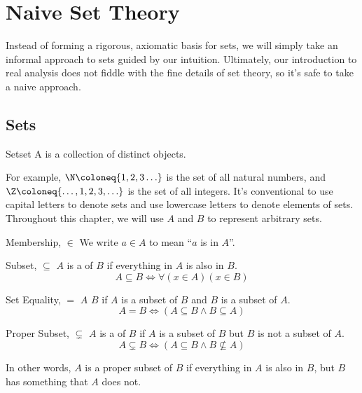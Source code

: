 \chapter{Naive Set Theory}
Instead of forming a rigorous, axiomatic basis for sets, we will simply take an informal approach to sets guided by our intuition. Ultimately, our introduction to real analysis does not fiddle with the fine details of set theory, so it's safe to take a naive approach.

\section{Sets}

\begin{dfnbox}{Set}{set}
    A  is a collection of distinct objects.
\end{dfnbox}

For example, $\N \coloneq \{1,2,3\ldots\}$ is the set of all natural numbers, and $\Z \coloneq \{ \ldots, 1, 2, 3, \ldots\}$ is the set of all integers. It's conventional to use capital letters to denote sets and use lowercase letters to denote elements of sets. Throughout this
chapter, we will use $A$ and $B$ to represent arbitrary sets.

\begin{dfnbox}{Membership, $\in$}{}
    We write $a \in A$ to mean ``$a$ is in $A$''.
\end{dfnbox}

\begin{dfnbox}{Subset, $\subseteq$}{}
    $A$ is a  of $B$ if everything in $A$ is also in $B$.
    \tcblower
    \[ A \subseteq B \iff \forall(x \in A)(x \in B) \]
\end{dfnbox}

\begin{dfnbox}{Set Equality, $=$}{}
    $A$  $B$ if $A$ is a subset of $B$ and $B$ is a subset of $A$.
    \tcblower
    \[ A = B \iff (A \subseteq B \land B \subseteq A) \]
\end{dfnbox}

\begin{dfnbox}{Proper Subset, $\subsetneq$}{}
    $A$ is a  of $B$ if $A$ is a subset of $B$ but $B$ is not a subset of $A$.
    \tcblower
    \[ A \subsetneq B \iff (A \subseteq B \land B \not\subseteq A) \]
\end{dfnbox}

In other words, $A$ is a proper subset of $B$ if everything in $A$ is also in $B$, but $B$ has something that $A$ does not.


